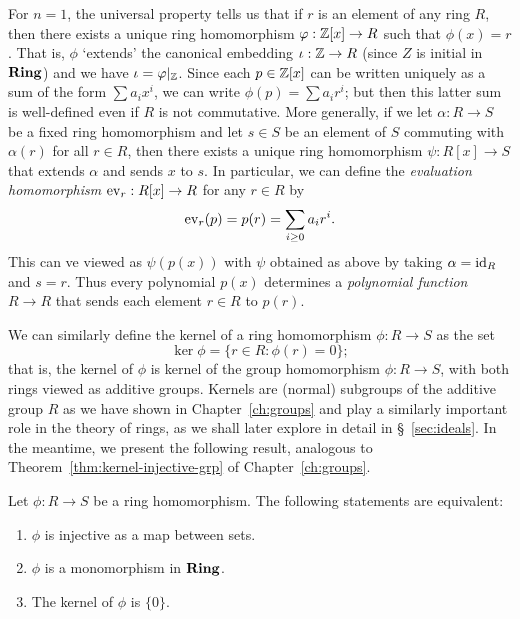 For \(n = 1\), the universal property tells us that if \(r\) is an element of
any ring \(R\), then there exists a unique ring homomorphism \(\varphi: \mathbb{Z}[x] \to
R\) such that \(\phi(x) = r\). That is, \(\phi\) `extends' the canonical
embedding \(\iota: \mathbb{Z} \to R\) (since \(Z\) is initial in \(\mathbf{Ring}\)) and we have
\(\iota = \varphi{|_{\mathbb{Z}}}\). Since each \(p \in \mathbb{Z}[x]\) can be written uniquely as
a sum of the form \(\sum a_i x^i\), we can write \(\phi(p) = \sum a_i r^i\); but
then this latter sum is well-defined even if \(R\) is not commutative. More
generally, if we let \(\alpha: R \to S\) be a fixed ring homomorphism and let
\(s \in S\) be an element of \(S\) commuting with \(\alpha(r)\) for all \(r \in
R\), then there exists a unique ring homomorphism \(\psi: R[x] \to S\) that
extends \(\alpha\) and sends \(x\) to \(s\). In particular, we can define the
\emph{evaluation homomorphism} \(\operatorname{ev}_r: R[x] \to R\) for any \(r \in R\) by 
\[
    \operatorname{ev}_r(p) = p(r) = \sum_{i \geq 0} a_i r^i.
\]
This can ve viewed as \(\psi(p(x))\) with \(\psi\) obtained as above by taking
\(\alpha = \operatorname{id}_R\) and \(s = r\). Thus every polynomial \(p(x)\) determines a
\emph{polynomial function} \(R \to R\) that sends each element \(r \in R\) to
\(p(r)\).

We can similarly define the kernel of a ring homomorphism \(\phi: R \to S\) as
the set
\[
    \ker \phi = \{r \in R : \phi(r) = 0\};
\]
that is, the kernel of \(\phi\) is kernel of the group homomorphism \(\phi: R
\to S\), with both rings viewed as additive groups. Kernels are (normal)
subgroups of the additive group \(R\) as we have shown in
Chapter~\ref{ch:groups} and play a similarly important role in the theory of
rings, as we shall later explore in detail in \S~\ref{sec:ideals}. In the
meantime, we present the following result, analogous to
Theorem~\ref{thm:kernel-injective-grp} of Chapter~\ref{ch:groups}.

\begin{theorem}
    \label{thm:kernel-injective-ring}
    Let \(\phi: R \to S\) be a ring homomorphism. The following statements are
    equivalent:
    \begin{enumerate}[label=(\alph*)]
        \item \(\phi\) is injective as a map between sets.
        \item \(\phi\) is a monomorphism in \(\mathbf{Ring}\).
        \item The kernel of \(\phi\) is \(\{0\}\).
    \end{enumerate}
\end{theorem}

